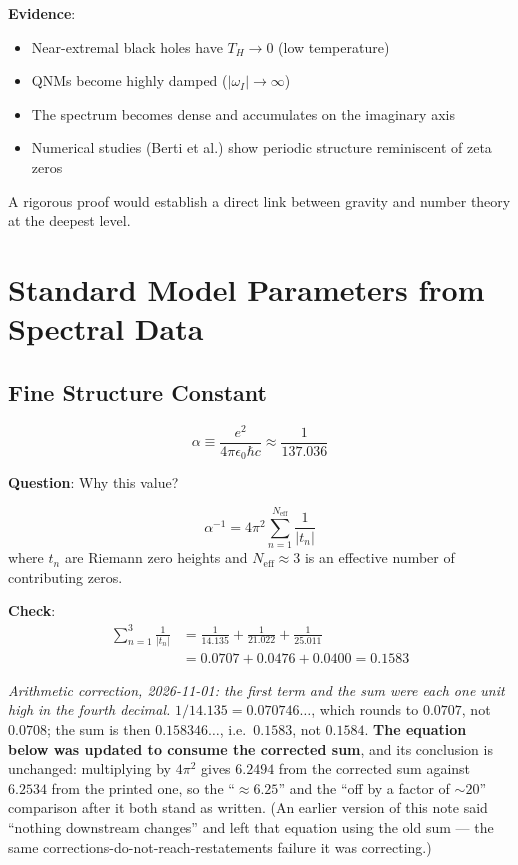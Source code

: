 \textbf{Evidence}:
\begin{itemize}
\item Near-extremal black holes have $T_H \to 0$ (low temperature)
\item QNMs become highly damped ($|\omega_I| \to \infty$)
\item The spectrum becomes dense and accumulates on the imaginary axis
\item Numerical studies (Berti et al.) show periodic structure reminiscent of zeta zeros
\end{itemize}

A rigorous proof would establish a direct link between gravity and number theory at the deepest level.

\section{Standard Model Parameters from Spectral Data}

\subsection{Fine Structure Constant}

\begin{equation}
\alpha \equiv \frac{e^2}{4\pi\epsilon_0 \hbar c} \approx \frac{1}{137.036}
\end{equation}

\textbf{Question}: Why this value?

\begin{conjecture}\label{conj:alpha-from-zeta}
\begin{equation}
\boxed{\alpha^{-1} = 4\pi^2 \sum_{n=1}^{N_{\text{eff}}} \frac{1}{|t_n|}}
\end{equation}
where $t_n$ are Riemann zero heights and $N_{\text{eff}} \approx 3$ is an effective number of contributing zeros.
\end{conjecture}

\textbf{Check}:
\begin{align}
\sum_{n=1}^3 \frac{1}{|t_n|} &= \frac{1}{14.135} + \frac{1}{21.022} + \frac{1}{25.011}\\
&= 0.0707 + 0.0476 + 0.0400 = 0.1583
\end{align}

\noindent\emph{Arithmetic correction, 2026-11-01: the first term and the sum
were each one unit high in the fourth decimal.} $1/14.135 = 0.070746\ldots$,
which rounds to $0.0707$, not $0.0708$; the sum is then $0.158346\ldots$, i.e.\
$0.1583$, not $0.1584$. \textbf{The equation below was updated to consume the
corrected sum}, and its conclusion is unchanged: multiplying by $4\pi^2$ gives
$6.2494$ from the corrected sum against $6.2534$ from the printed one, so the
``$\approx 6.25$'' and the ``off by a factor of ${\sim}20$'' comparison after it
both stand as written. (An earlier version of this note said ``nothing
downstream changes'' and left that equation using the old sum --- the same
corrections-do-not-reach-restatements failure it was correcting.)

